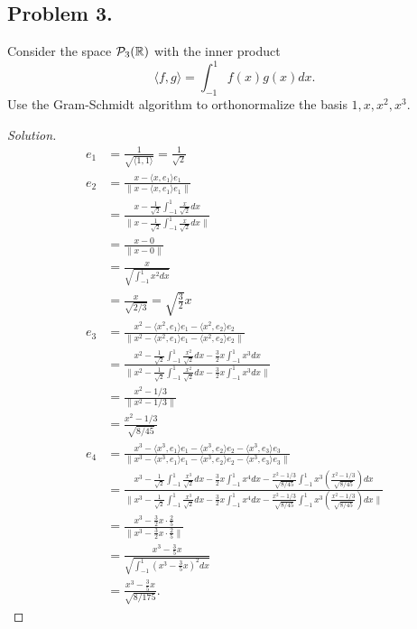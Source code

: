 \documentclass{article}
\newcommand*{\R}{\ensuremath{\mathbb{R}}}
\begin{document}
\newpage
\subsection*{Problem 3.}
Consider the space ${\cal P}_3(\R)$ with the inner product
$$ \langle f, g \rangle = \int_{-1}^1   f(x) g(x) dx. $$
Use the Gram-Schmidt algorithm to orthonormalize the basis $1,x,x^2,x^3$.
\begin{proof}[Solution]
    \begin{align*}
        e_1 & = \frac{1}{\sqrt{\langle1,1\rangle}} = \frac{1}{\sqrt{2}} \\
        e_2 & = \frac{x-\langle x,e_1\rangle e_1}{\|x-\langle x,e_1\rangle e_1\|} \\
        & = \frac{x-\frac{1}{\sqrt{2}}\int_{-1}^{1}\frac{x}{\sqrt{2}}dx}
        {\|x-\frac{1}{\sqrt{2}}\int_{-1}^{1}\frac{x}{\sqrt{2}}dx\|} \\
        & = \frac{x-0}{\|x-0\|} \\
        & = \frac{x}{\sqrt{\int_{-1}^{1}x^2dx}} \\
        & = \frac{x}{\sqrt{2/3}} = \sqrt{\frac{3}{2}}x \\
        e_3 & = \frac{x^2-\langle x^2,e_1\rangle e_1-\langle x^2,e_2\rangle e_2}
        {\|x^2-\langle x^2,e_1\rangle e_1-\langle x^2,e_2\rangle e_2\|} \\
        & = \frac{x^2-\frac{1}{\sqrt{2}}\int_{-1}^{1}\frac{x^2}{\sqrt{2}}dx
        -\frac{3}{2}x\int_{-1}^{1}x^3dx}
        {\|x^2-\frac{1}{\sqrt{2}}\int_{-1}^{1}\frac{x^2}{\sqrt{2}}dx
        -\frac{3}{2}x\int_{-1}^{1}x^3dx\|} \\
        & = \frac{x^2-1/3}{\|x^2-1/3\|} \\
        & = \frac{x^2-1/3}{\sqrt{8/45}} \\
        e_4 & = \frac{x^3-\langle x^3,e_1\rangle e_1-\langle x^3,e_2\rangle e_2
        -\langle x^3,e_3\rangle e_3}
        {\|x^3-\langle x^3,e_1\rangle e_1-\langle x^3,e_2\rangle e_2
        -\langle x^3,e_3\rangle e_3\|} \\
        & = \frac{x^3-\frac{1}{\sqrt{2}}\int_{-1}^{1}\frac{x^3}{\sqrt{2}}dx
        -\frac{3}{2}x\int_{-1}^{1}x^4dx-\frac{x^2-1/3}{\sqrt{8/45}}\int_{-1}^{1}x^3\left(\frac{x^2-1/3}{\sqrt{8/45}}\right)dx}
        {\|x^3-\frac{1}{\sqrt{2}}\int_{-1}^{1}\frac{x^3}{\sqrt{2}}dx
        -\frac{3}{2}x\int_{-1}^{1}x^4dx-\frac{x^2-1/3}{\sqrt{8/45}}\int_{-1}^{1}x^3\left(\frac{x^2-1/3}{\sqrt{8/45}}\right)dx\|} \\
        & = \frac{x^3-\frac{3}{2}x\cdot\frac{2}{5}}{\|x^3-\frac{3}{2}x\cdot\frac{2}{5}\|} \\
        & = \frac{x^3-\frac{3}{5}x}{\sqrt{\int_{-1}^{1}(x^3-\frac{3}{5}x)^2dx}} \\
        & = \frac{x^3-\frac{3}{5}x}{\sqrt{8/175}}.
    \end{align*}
\end{proof}
\end{document}
